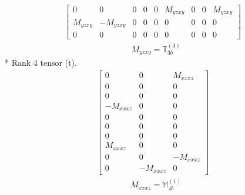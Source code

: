 \documentclass[fleqn,8pt,landscape]{jsarticle}
\begin{document}
\begin{align*}
\begin{bmatrix} 0 & 0 & 0 & 0 & 0 & M_{yzxy} & 0 & 0 & M_{yzxy} \\ M_{yzxy} & - M_{yzxy} & 0 & 0 & 0 & 0 & 0 & 0 & 0 \\ 0 & 0 & 0 & 0 & 0 & 0 & 0 & 0 & 0 \end{bmatrix}
\end{align*}
\begin{align*}
& M_{yzxy} = \mathbb{T}_{3b}^{(3)}
\end{align*}
* Rank 4 tensor (t).
\begin{align*}
\begin{bmatrix} 0 & 0 & M_{xxxz} \\ 0 & 0 & 0 \\ 0 & 0 & 0 \\ - M_{xxxz} & 0 & 0 \\ 0 & 0 & 0 \\ 0 & 0 & 0 \\ 0 & 0 & 0 \\ M_{xxxz} & 0 & 0 \\ 0 & 0 & - M_{xxxz} \\ 0 & - M_{xxxz} & 0 \end{bmatrix}
\end{align*}
\begin{align*}
& M_{xxxz} = \mathbb{M}_{4b}^{(1)}
\end{align*}
\end{document}
